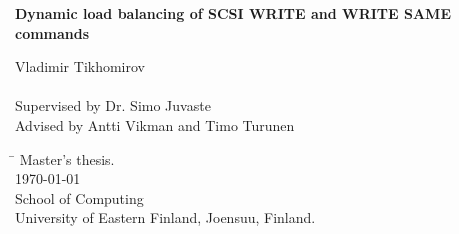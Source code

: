 
\begin{titlepage}
\vspace*{5cm}
\noindent
\begin{flushleft}
\setlength{\baselineskip}{2\baselineskip}
{{\Huge \bf Dynamic load balancing of SCSI WRITE and WRITE SAME commands}}
\end{flushleft}

\noindent
Vladimir Tikhomirov
\\ \\
\noindent
Supervised by Dr. Simo Juvaste
\\
\noindent
Advised by Antti Vikman and Timo Turunen

\vspace{1cm}
\vspace{\fill}
\vspace{1cm}
\begin{tabbing}
\= \kill
\>Master's thesis. \\
\>\today\\
\>School of Computing\\
\>University of Eastern Finland, Joensuu, Finland. \\
\> \\
\end{tabbing}
\end{titlepage}
